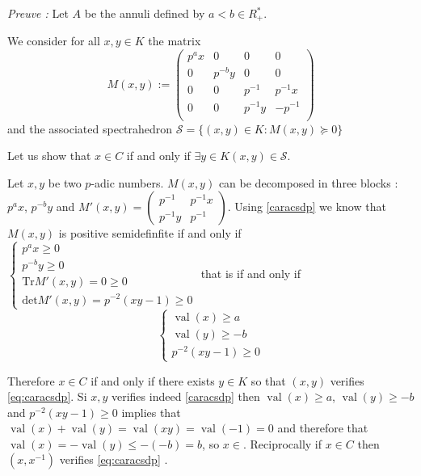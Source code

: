 \documentclass[a4paper,12pt]{article}
\DeclareMathOperator{\val}{val}
\begin{document}
\textit{Preuve :}
Let $A$ be the annuli defined by $a<b \in R^*_+$.

We consider for all $x,y \in K $ the matrix  $$M(x,y) :=
\begin{pmatrix} 
	p^ax & 0 & 0 & 0 \\
	0 & p^{-b}y & 0 & 0 \\
	0 & 0 & p^{-1} & p^{-1}x \\
	0 & 0 & p^{-1}y & - p^{-1}  \\
\end{pmatrix} $$ and the associated spectrahedron $\mathcal{S}= \{(x,y) \in K  : M(x,y) \succeq 0\} $

Let us show that $x \in C$ if and only if  $\exists y \in K \left( x,y \right) \in \mathcal{S}$.

Let $x,y$ be two $p$-adic numbers.
$M(x,y)$ can be decomposed in three blocks : $p^ax$, $p^{-b}y $ and $M'(x,y) = \begin{pmatrix} p^{-1} & p^{-1}x \\ p^{-1} y & p^{-1}\end{pmatrix} $. Using \ref{caracsdp} we know that $M(x,y)$ is positive semidefinfite if and only if
$
\begin{cases}
	p^ax \ge 0 \\
	p^{-b}y \ge 0\\
	\text{Tr}M'\left( x,y \right) = 0 \ge 0\\
	\text{det} M'(x,y ) = p^{-2}\left( xy-1 \right)  \ge 0 
\end{cases}
$ 
that is if and only if 
\begin{equation}
	\label{eq:caracsdp} 
	\begin{cases} 
		\val\left(x\right)\ge a\\
		\val\left(y\right)\ge -b\\
		p^{-2} \left( xy-1 \right) \ge 0
	\end{cases}
\end{equation}




Therefore $x \in C$ if and only if there exists $y \in K $ so that $(x, y)$ verifies \ref{eq:caracsdp}. Si $x, y$ verifies indeed \ref{caracsdp} then $\val\left(x\right)\ge a$, $\val\left(y\right)\ge -b$ and $p^{-2} \left( xy-1 \right) \ge 0$ implies that $\val\left(x\right)+\val\left(y\right)=\val\left(xy\right) = \val\left(-1\right) =0$ and therefore that $\val\left(x\right)=-\val\left(y\right)\le -(-b)  =b$, so $x \in $. Reciprocally if $x \in C$ then $(x,x^{-1}) $ verifies \ref{eq:caracsdp}  .
\end{document}
